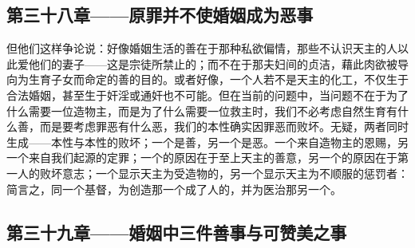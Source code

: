 
\subsection{第三十八章——原罪并不使婚姻成为恶事}

但他们这样争论说：好像婚姻生活的善在于那种私欲偏情，那些不认识天主的人以此爱他们的妻子——这是宗徒所禁止的；而不在于那夫妇间的贞洁，藉此肉欲被导向为生育子女而命定的善的目的。或者好像，一个人若不是天主的化工，不仅生于合法婚姻，甚至生于奸淫或通奸也不可能。但在当前的问题中，当问题不在于为了什么需要一位造物主，而是为了什么需要一位救主时，我们不必考虑自然生育有什么善，而是要考虑罪恶有什么恶，我们的本性确实因罪恶而败坏。无疑，两者同时生成——本性与本性的败坏；一个是善，另一个是恶。一个来自造物主的恩赐，另一个来自我们起源的定罪；一个的原因在于至上天主的善意，另一个的原因在于第一人的败坏意志；一个显示天主为受造物的，另一个显示天主为不顺服的惩罚者：简言之，同一个基督，为创造那一个成了人的，并为医治那另一个。\par


\subsection{第三十九章——婚姻中三件善事与可赞美之事}

